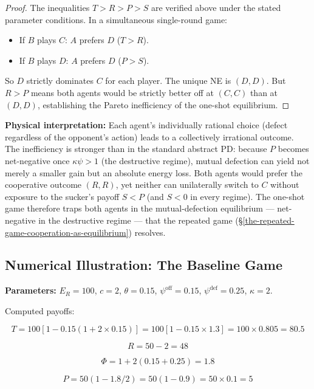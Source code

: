 \documentclass[11pt]{article}
\theoremstyle{plain}
\theoremstyle{definition}
\theoremstyle{remark}
\let\origsubsection\subsection
\renewcommand{\subsection}{\needspace{7\baselineskip}\origsubsection}
\begin{document}
\begin{proof}
The inequalities $T > R > P > S$ are verified above under the stated parameter conditions. In a simultaneous single-round game:

\begin{itemize}
\item If $B$ plays $C$: $A$ prefers $D$ ($T > R$).
\item If $B$ plays $D$: $A$ prefers $D$ ($P > S$).
\end{itemize}

So $D$ strictly dominates $C$ for each player. The unique NE is $(D, D)$. But $R > P$ means both agents would be strictly better off at $(C, C)$ than at $(D, D)$, establishing the Pareto inefficiency of the one-shot equilibrium.
\end{proof}

\textbf{Physical interpretation:} Each agent's individually rational
choice (defect regardless of the opponent's action) leads to a
collectively irrational outcome. The inefficiency is stronger than in
the standard abstract PD: because \(P\) becomes net-negative once
\(\kappa\psi > 1\) (the destructive regime), mutual defection can yield
not merely a smaller gain but an absolute energy loss. Both agents would
prefer the cooperative outcome \((R, R)\), yet neither can unilaterally
switch to \(C\) without exposure to the sucker's payoff \(S < P\) (and
\(S < 0\) in every regime). The one-shot game therefore traps both
agents in the mutual-defection equilibrium --- net-negative in the
destructive regime --- that the repeated game
(§\ref{the-repeated-game-cooperation-as-equilibrium}) resolves.

\subsection{Numerical Illustration: The Baseline
Game}\label{numerical-illustration-the-baseline-game}

\textbf{Parameters:} \(E_R = 100\), \(c = 2\), \(\theta = 0.15\),
\(\psi^{\text{off}} = 0.15\), \(\psi^{\text{def}} = 0.25\),
\(\kappa = 2\).

Computed payoffs:

\[T = 100[1 - 0.15(1 + 2 \times 0.15)] = 100[1 - 0.15 \times 1.3] = 100 \times 0.805 = 80.5\]

\[R = 50 - 2 = 48\]

\[\Phi = 1 + 2(0.15 + 0.25) = 1.8\]

\[P = 50(1 - 1.8/2) = 50(1 - 0.9) = 50 \times 0.1 = 5\]
\end{document}
